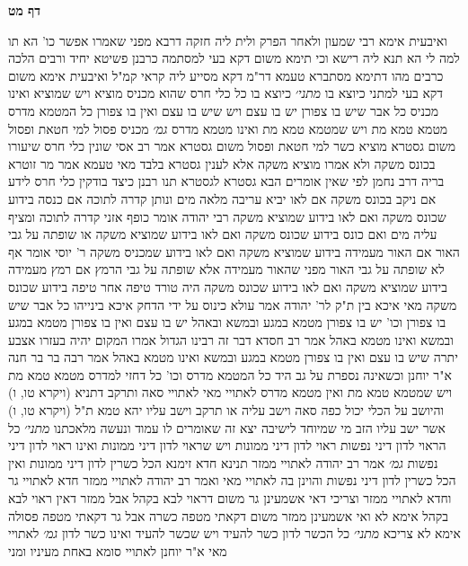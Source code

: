 \documentclass[12pt, openany]{book}
\newcommand{\sethebfont}{
\fontsize{10.5pt}{21.0pt} \selectfont
}
\newcommand{\twocol}[1]{
	{\sethebfont \begin{multicols}{2}
			#1
	\end{multicols}}	
}
\newcommand{\sectname}{}
\newcommand{\newsection}[1]{
	\addcontentsline{toc}{section}{#1}
	\renewcommand{\sectname}{#1}	
	\vspace{-\baselineskip}
	\begin{center}
		\textbf{%
\fontsize{16pt}{16pt}\selectfont
			#1}
	\end{center}
	\vspace{-\baselineskip}
	\nopagebreak
}
\begin{document}
\newsection{דף מט}
\twocol{ואיבעית אימא רבי שמעון ולאחר הפרק ולית ליה חזקה דרבא
מפני שאמרו אפשר כו' הא תו למה לי הא תנא ליה רישא 
וכי תימא משום דקא בעי למסתמה כרבנן פשיטא יחיד ורבים הלכה כרבים 
מהו דתימא מסתברא טעמא דר"מ דקא מסייע ליה קראי קמ"ל ואיבעית אימא משום דקא בעי למתני כיוצא בו
{\large\emph{מתני׳}} כיוצא בו כל כלי חרס שהוא מכניס מוציא ויש שמוציא ואינו מכניס 
כל אבר שיש בו צפורן יש בו עצם ויש שיש בו עצם ואין בו צפורן 
כל המטמא מדרס מטמא טמא מת ויש שמטמא טמא מת ואינו מטמא מדרס
{\large\emph{גמ׳}} מכניס פסול למי חטאת ופסול משום גסטרא מוציא כשר למי חטאת ופסול משום גסטרא
אמר רב אסי שונין כלי חרס שיעורו בכונס משקה ולא אמרו מוציא משקה אלא לענין גסטרא בלבד מאי טעמא אמר מר זוטרא בריה דרב נחמן לפי שאין אומרים הבא גסטרא לגסטרא 
תנו רבנן כיצד בודקין כלי חרס לידע אם ניקב בכונס משקה אם לאו יביא עריבה מלאה מים ונותן קדרה לתוכה אם כנסה בידוע שכונס משקה ואם לאו בידוע שמוציא משקה
רבי יהודה אומר כופף אזני קדרה לתוכה ומציף עליה מים ואם כונס בידוע שכונס משקה ואם לאו בידוע שמוציא משקה 
או שופתה על גבי האור אם האור מעמידה בידוע שמוציא משקה ואם לאו בידוע שמכניס משקה 
ר' יוסי אומר אף לא שופתה על גבי האור מפני שהאור מעמידה אלא שופתה על גבי הרמץ אם רמץ מעמידה בידוע שמוציא משקה ואם לאו בידוע שכונס משקה היה טורד טיפה אחר טיפה בידוע שכונס משקה 
מאי איכא בין ת"ק לר' יהודה אמר עולא כינוס על ידי הדחק איכא בינייהו
כל אבר שיש בו צפורן וכו' יש בו צפורן מטמא במגע ובמשא ובאהל יש בו עצם ואין בו צפורן מטמא במגע ובמשא ואינו מטמא באהל 
אמר רב חסדא דבר זה רבינו הגדול אמרו המקום יהיה בעזרו אצבע יתרה שיש בו עצם ואין בו צפורן מטמא במגע ובמשא ואינו מטמא באהל 
אמר רבה בר בר חנה א"ר יוחנן וכשאינה נספרת על גב היד
כל המטמא מדרס וכו' כל דחזי למדרס מטמא טמא מת 
ויש שמטמא טמא מת ואין מטמא מדרס לאתויי מאי לאתויי סאה ותרקב
דתניא (ויקרא טו, ו) והיושב על הכלי יכול כפה סאה וישב עליה או תרקב וישב עליו יהא טמא
ת"ל (ויקרא טו, ו) אשר ישב עליו הזב מי שמיוחד לישיבה יצא זה שאומרים לו עמוד ונעשה מלאכתנו
{\large\emph{מתני׳}} כל הראוי לדון דיני נפשות ראוי לדון דיני ממונות ויש שראוי לדון דיני ממונות ואינו ראוי לדון דיני נפשות
{\large\emph{גמ׳}} אמר רב יהודה לאתויי ממזר 
תנינא חדא זימנא הכל כשרין לדון דיני ממונות ואין הכל כשרין לדון דיני נפשות והוינן בה לאתויי מאי ואמר רב יהודה לאתויי ממזר חדא לאתויי גר וחדא לאתויי ממזר 
וצריכי דאי אשמעינן גר משום דראוי לבא בקהל אבל ממזר דאין ראוי לבא בקהל אימא לא 
ואי אשמעינן ממזר משום דקאתי מטפה כשרה אבל גר דקאתי מטפה פסולה אימא לא צריכא
{\large\emph{מתני׳}} כל הכשר לדון כשר להעיד ויש שכשר להעיד ואינו כשר לדון
{\large\emph{גמ׳}} לאתויי מאי א"ר יוחנן לאתויי סומא באחת מעיניו ומני}
\end{document}
